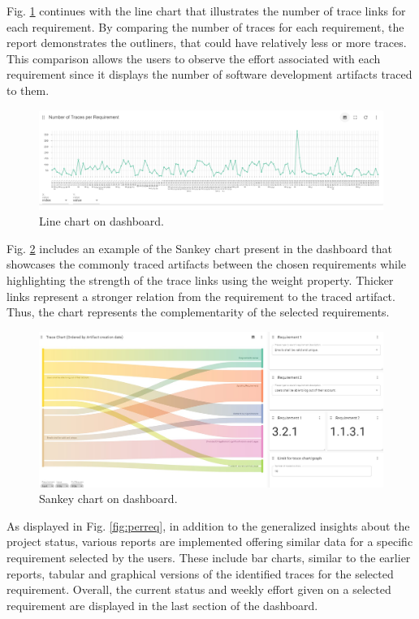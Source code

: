 \documentclass[conference]{IEEEtran}
\begin{document}
Fig. \ref{fig:linechart} continues with the line chart that illustrates the number of trace links for each requirement. By comparing the number of traces for each requirement, the report demonstrates the outliners, that could have relatively less or more traces. This comparison allows the users to observe the effort associated with each requirement since it displays the number of software development artifacts traced to them.

\begin{figure}[htb]
    \centering
    \includegraphics[width=0.9\linewidth]{figs/linechart.png}
    \caption{Line chart on dashboard.}
    \label{fig:linechart}
\end{figure}

Fig. \ref{fig:sankey} includes an example of the Sankey chart present in the dashboard that showcases the commonly traced artifacts between the chosen requirements while highlighting the strength of the trace links using the weight property. Thicker links represent a stronger relation from the requirement to the traced artifact. Thus, the chart represents the complementarity of the selected requirements.

\begin{figure}[htb]
    \centering
    \includegraphics[width=0.9\linewidth]{figs/sankey.jpg}
    \caption{Sankey chart on dashboard.}
    \label{fig:sankey}
\end{figure}

As displayed in Fig. \ref{fig:perreq}, in addition to the generalized insights about the project status, various reports are implemented offering similar data for a specific requirement selected by the users. These include bar charts, similar to the earlier reports, tabular and graphical versions of the identified traces for the selected requirement. Overall, the current status and weekly effort given on a selected requirement are displayed in the last section of the dashboard.
\end{document}
